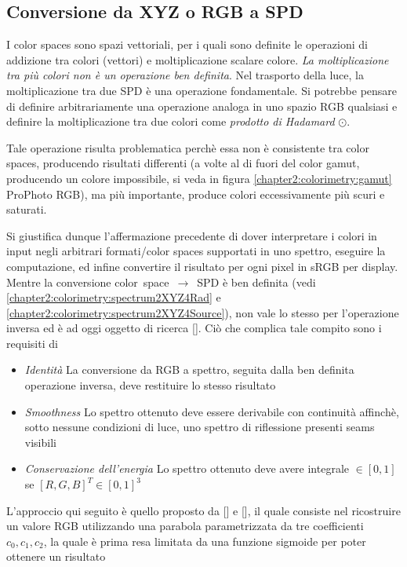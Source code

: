 \subsection{Conversione da XYZ o RGB a SPD}
I color spaces sono spazi vettoriali, per i quali sono definite le operazioni di addizione tra colori (vettori) e moltiplicazione scalare colore.
\textit{La moltiplicazione tra pi\`u colori non \`e un operazione ben definita}. Nel trasporto della luce, la moltiplicazione tra due SPD \`e una 
operazione fondamentale. Si potrebbe pensare di definire arbitrariamente una operazione analoga in uno spazio RGB qualsiasi e definire la 
moltiplicazione tra due colori come \textit{prodotto di Hadamard} $\odot$.\par
Tale operazione risulta problematica perch\`e essa non \`e consistente tra color spaces, producendo risultati differenti (a volte al di fuori del 
color gamut, producendo un colore impossibile, si veda in figura \ref{chapter2:colorimetry:gamut} ProPhoto RGB), ma pi\`u importante, produce colori
eccessivamente pi\`u scuri e saturati.\par
Si giustifica dunque l'affermazione precedente di dover interpretare i colori in input negli arbitrari formati/color spaces supportati in uno spettro,
eseguire la computazione, ed infine convertire il risultato per ogni pixel in sRGB per display. Mentre la conversione 
\mbox{color space $\rightarrow$ SPD} \`e ben definita (vedi \ref{chapter2:colorimetry:spectrum2XYZ4Rad} e 
\ref{chapter2:colorimetry:spectrum2XYZ4Source}), non vale lo stesso per l'operazione inversa ed \`e ad oggi oggetto di ricerca [\cite{spectrum}].
Ci\`o che complica tale compito sono i requisiti di 
\begin{itemize}[topsep=0pt, noitemsep]
	\item[] \textit{Identit\`a} La conversione da RGB a spettro, seguita dalla ben definita operazione inversa, deve restituire lo stesso risultato
	\item[] \textit{Smoothness} Lo spettro ottenuto deve essere derivabile con continuit\`a affinch\`e, sotto nessune condizioni di luce, uno spettro
		di riflessione presenti seams visibili
	\item[] \textit{Conservazione dell'energia} Lo spettro ottenuto deve avere integrale $\in [0,1]$ se $[R, G, B]^T \in [0,1]^3$
\end{itemize}
L'approccio qui seguito \`e quello proposto da [\cite{pharr}] e [\cite{rgb2spec}], il quale consiste nel ricostruire un valore RGB utilizzando una
parabola parametrizzata da tre coefficienti $c_0,c_1,c_2$, la quale \`e prima resa limitata da una funzione sigmoide per poter ottenere un risultato
